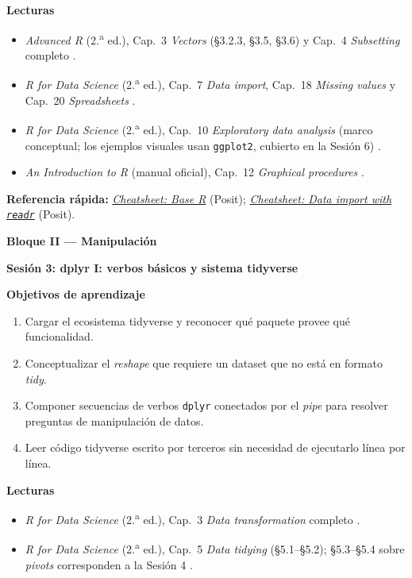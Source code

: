 \documentclass[11pt,letterpaper]{article}
\newcommand{\bloqueCurso}[1]{%
  \clearpage%
  \vspace*{0.5cm}%
  {\centering\color{main}\fontsize{26pt}{32pt}\selectfont\bfseries #1\par}%
  \vspace{0.8cm}%
}
\newcommand{\sesion}[2]{%
  \bigskip%
  {\color{main}\Large\bfseries Sesión #1: #2\par}%
  \smallskip%
}
\newcommand{\cheatsheet}[2]{%
  \href{https://rstudio.github.io/cheatsheets/#1.pdf}{\textit{Cheatsheet: #2}}%
}
\begin{document}
\medskip
\noindent\textbf{Lecturas}
\begin{itemize}[leftmargin=*, itemsep=1pt]
    \item \textit{Advanced R} (2.\textsuperscript{a} ed.), Cap.\ 3 \textit{Vectors} (§3.2.3, §3.5, §3.6) y Cap.\ 4 \textit{Subsetting} completo \cite{wickham2019advr}.
    \item \textit{R for Data Science} (2.\textsuperscript{a} ed.), Cap.\ 7 \textit{Data import}, Cap.\ 18 \textit{Missing values} y Cap.\ 20 \textit{Spreadsheets} \cite{wickham2023r4ds}.
    \item \textit{R for Data Science} (2.\textsuperscript{a} ed.), Cap.\ 10 \textit{Exploratory data analysis} (marco conceptual; los ejemplos visuales usan \texttt{ggplot2}, cubierto en la Sesión 6) \cite{wickham2023r4ds}.
    \item \textit{An Introduction to R} (manual oficial), Cap.\ 12 \textit{Graphical procedures} \cite{rcoreteam-intro}.
\end{itemize}

\medskip
\noindent\textbf{Referencia rápida:} \cheatsheet{base-r}{Base R} (Posit); \cheatsheet{data-import}{Data import with \texttt{readr}} (Posit).

\bloqueCurso{Bloque II --- Manipulación}

\sesion{3}{dplyr I: verbos básicos y sistema tidyverse}
\medskip
\noindent\textbf{Objetivos de aprendizaje}
\begin{enumerate}[leftmargin=*, itemsep=1pt]
    \item Cargar el ecosistema tidyverse y reconocer qué paquete provee qué funcionalidad.
    \item Conceptualizar el \textit{reshape} que requiere un dataset que no está en formato \textit{tidy}.
    \item Componer secuencias de verbos \texttt{dplyr} conectados por el \textit{pipe} para resolver preguntas de manipulación de datos.
    \item Leer código tidyverse escrito por terceros sin necesidad de ejecutarlo línea por línea.
\end{enumerate}

\medskip
\noindent\textbf{Lecturas}
\begin{itemize}[leftmargin=*, itemsep=1pt]
    \item \textit{R for Data Science} (2.\textsuperscript{a} ed.), Cap.\ 3 \textit{Data transformation} completo \cite{wickham2023r4ds}.
    \item \textit{R for Data Science} (2.\textsuperscript{a} ed.), Cap.\ 5 \textit{Data tidying} (§5.1--§5.2); §5.3--§5.4 sobre \textit{pivots} corresponden a la Sesión 4 \cite{wickham2023r4ds}.
\end{itemize}
\end{document}
